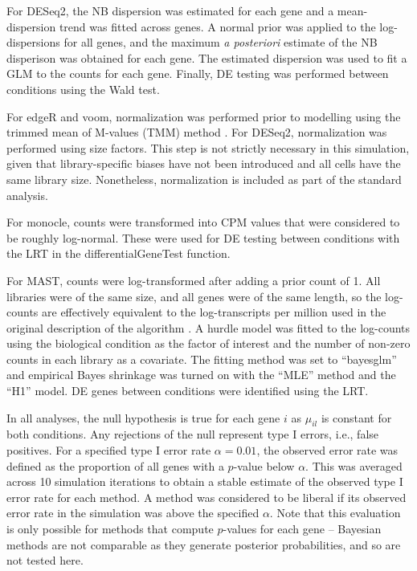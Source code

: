 \documentclass{article}
\begin{document}
For DESeq2, the NB dispersion was estimated for each gene and a mean-dispersion trend was fitted across genes.
A normal prior was applied to the log-dispersions for all genes, and the maximum \textit{a posteriori} estimate of the NB disperison was obtained for each gene.
The estimated dispersion was used to fit a GLM to the counts for each gene.
Finally, DE testing was performed between conditions using the Wald test.

For edgeR and voom, normalization was performed prior to modelling using the trimmed mean of M-values (TMM) method \cite{robinson2010scaling}.
For DESeq2, normalization was performed using size factors.
This step is not strictly necessary in this simulation, given that library-specific biases have not been introduced and all cells have the same library size.
Nonetheless, normalization is included as part of the standard analysis.

For monocle, counts were transformed into CPM values that were considered to be roughly log-normal.
These were used for DE testing between conditions with the LRT in the differentialGeneTest function.

For MAST, counts were log-transformed after adding a prior count of 1.
All libraries were of the same size, and all genes were of the same length, 
    so the log-counts are effectively equivalent to the log-transcripts per million used in the original description of the algorithm \cite{finak2015mast}.
A hurdle model was fitted to the log-counts using the biological condition as the factor of interest and the number of non-zero counts in each library as a covariate.
The fitting method was set to ``bayesglm'' and empirical Bayes shrinkage was turned on with the ``MLE'' method and the ``H1'' model.
DE genes between conditions were identified using the LRT.

In all analyses, the null hypothesis is true for each gene $i$ as $\mu_{il}$ is constant for both conditions.
Any rejections of the null represent type I errors, i.e., false positives.
For a specified type I error rate $\alpha = 0.01$, the observed error rate was defined as the proportion of all genes with a $p$-value below $\alpha$.
This was averaged across 10 simulation iterations to obtain a stable estimate of the observed type I error rate for each method. 
A method was considered to be liberal if its observed error rate in the simulation was above the specified $\alpha$.
Note that this evaluation is only possible for methods that compute $p$-values for each gene -- 
    Bayesian methods \cite{vallejos2015basics,kharchenko2014bayesian} are not comparable as they generate posterior probabilities, and so are not tested here.
\end{document}
